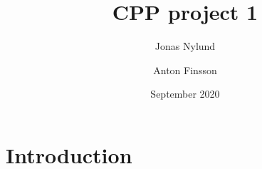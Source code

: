 \documentclass{article}
\title{CPP project 1}
\author{Jonas Nylund \and Anton Finsson }
\date{September 2020}
\begin{document}
\maketitle

\section{Introduction}
\end{document}
